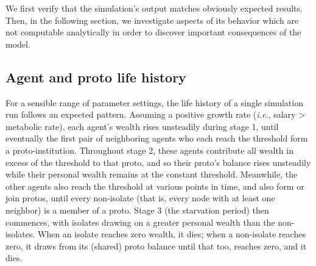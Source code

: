 
We first verify that the simulation's output matches obviously expected
results. Then, in the following section, we investigate aspects of its behavior
which are not computable analytically in order to discover important
consequences of the model.


\subsection{Agent and proto life history}

For a sensible range of parameter settings, the life history of a single
simulation run follows an expected pattern. Assuming a positive growth rate
(\textit{i.e.}, salary > metabolic rate), each agent's wealth rises unsteadily
during stage 1, until eventually the first pair of neighboring agents who each
reach the threshold form a proto-institution. Throughout stage 2, these agents
contribute all wealth in excess of the threshold to that proto, and so their
proto's balance rises unsteadily while their personal wealth remains at the
constant threshold. Meanwhile, the other agents also reach the threshold at
various points in time, and also form or join protos, until every non-isolate
(that is, every node with at least one neighbor) is a member of a proto. Stage
3 (the starvation period) then commences, with isolates drawing on a greater
personal wealth than the non-isolates. When an isolate reaches zero wealth, it
dies; when a non-isolate reaches zero, it draws from its (shared) proto balance
until that too, reaches zero, and it dies.

